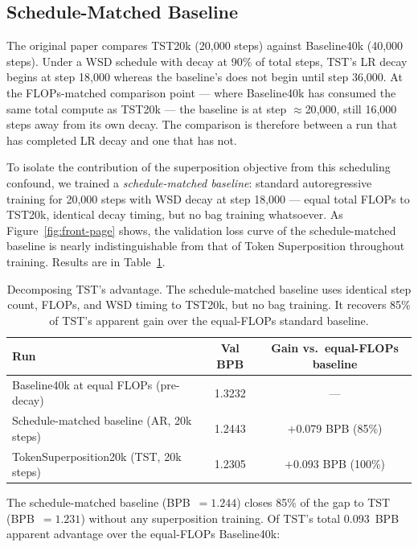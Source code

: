 \documentclass{article}
\begin{document}
\subsection{Schedule-Matched Baseline}
\label{sec:schedule}

The original paper compares TST20k (20{,}000 steps) against Baseline40k (40{,}000 steps).
Under a WSD schedule with decay at 90\% of total steps, TST's LR decay begins at step
18{,}000 whereas the baseline's does not begin until step 36{,}000.
At the FLOPs-matched comparison point — where Baseline40k has consumed the same total
compute as TST20k — the baseline is at step $\approx$20{,}000, still 16{,}000 steps
away from its own decay.
The comparison is therefore between a run that has completed LR decay and one that
has not.

To isolate the contribution of the superposition objective from this scheduling
confound, we trained a \emph{schedule-matched baseline}: standard autoregressive
training for 20{,}000 steps with WSD decay at step 18{,}000 — equal total FLOPs to
TST20k, identical decay timing, but no bag training whatsoever.
As Figure~\ref{fig:front-page} shows, the validation loss curve of the
schedule-matched baseline is nearly indistinguishable from that of Token Superposition
throughout training.
Results are in Table~\ref{tab:schedule}.

\begin{table}[h]
\centering
\begin{tabular}{lcc}
\toprule
\textbf{Run} & \textbf{Val BPB} & \textbf{Gain vs.\ equal-FLOPs baseline} \\
\midrule
Baseline40k at equal FLOPs (pre-decay) & 1.3232 & --- \\
Schedule-matched baseline (AR, 20k steps) & 1.2443 & $+$0.079 BPB \quad (85\%) \\
TokenSuperposition20k (TST, 20k steps) & 1.2305 & $+$0.093 BPB \quad (100\%) \\
\bottomrule
\end{tabular}
\caption{Decomposing TST's advantage. The schedule-matched baseline uses identical
step count, FLOPs, and WSD timing to TST20k, but no bag training.
It recovers 85\% of TST's apparent gain over the equal-FLOPs standard baseline.}
\label{tab:schedule}
\end{table}

The schedule-matched baseline (BPB~$= 1.244$) closes 85\% of the gap to TST
(BPB~$= 1.231$) without any superposition training.
Of TST's total 0.093~BPB apparent advantage over the equal-FLOPs Baseline40k:
\end{document}
